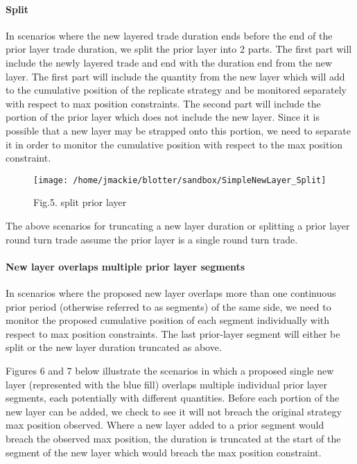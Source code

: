 \hypertarget{split}{%
\paragraph{Split}\label{split}}

In scenarios where the new layered trade duration ends before the end of
the prior layer trade duration, we split the prior layer into 2 parts.
The first part will include the newly layered trade and end with the
duration end from the new layer. The first part will include the
quantity from the new layer which will add to the cumulative position of
the replicate strategy and be monitored separately with respect to max
position constraints. The second part will include the portion of the
prior layer which does not include the new layer. Since it is possible
that a new layer may be strapped onto this portion, we need to separate
it in order to monitor the cumulative position with respect to the max
position constraint.

\begin{Schunk}
\begin{figure}

{\centering \texttt{[image: /home/jmackie/blotter/sandbox/SimpleNewLayer\_Split]} 

}

\caption[Fig.5]{Fig.5. split prior layer}\label{fig:SimpleNewLayer_Split diagram}
\end{figure}
\end{Schunk}

The above scenarios for truncating a new layer duration or splitting a
prior layer round turn trade assume the prior layer is a single round
turn trade.

\hypertarget{new-layer-overlaps-multiple-prior-layer-segments}{%
\paragraph{New layer overlaps multiple prior layer
segments}\label{new-layer-overlaps-multiple-prior-layer-segments}}

In scenarios where the proposed new layer overlaps more than one
continuous prior period (otherwise referred to as segments) of the same
side, we need to monitor the proposed cumulative position of each
segment individually with respect to max position constraints. The last
prior-layer segment will either be split or the new layer duration
truncated as above.

Figures 6 and 7 below illustrate the scenarios in which a proposed
single new layer (represented with the blue fill) overlaps multiple
individual prior layer segments, each potentially with different
quantities. Before each portion of the new layer can be added, we check
to see it will not breach the original strategy max position observed.
Where a new layer added to a prior segment would breach the observed max
position, the duration is truncated at the start of the segment of the
new layer which would breach the max position constraint.

